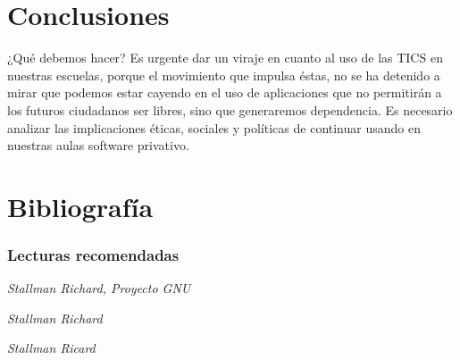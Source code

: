 \documentclass{beamer}
\begin{document}
\section{Conclusiones}
\begin{frame}{¿Qué debemos hacer?}
Es urgente dar un viraje en cuanto al uso de las TICS en nuestras escuelas, porque el movimiento que impulsa éstas, no se ha detenido a mirar que podemos estar cayendo en el uso de aplicaciones que no permitirán a los futuros ciudadanos ser libres, sino que generaremos dependencia. Es necesario analizar las implicaciones éticas, sociales y políticas de continuar usando en nuestras aulas software privativo.
\end{frame}
\section*{Bibliografía}
\begin{frame}[allowframebreaks]
  \frametitle<presentation>{Lecturas recomendadas}
    
  \begin{thebibliography}{10}
    
  
  \beamertemplatearticlebibitems

 \emph{Stallman Richard, Proyecto GNU}

   \emph{Stallman Richard}
   
  
 \emph{Stallman Ricard}
  
  \end{thebibliography}
\end{frame}
\end{document}
